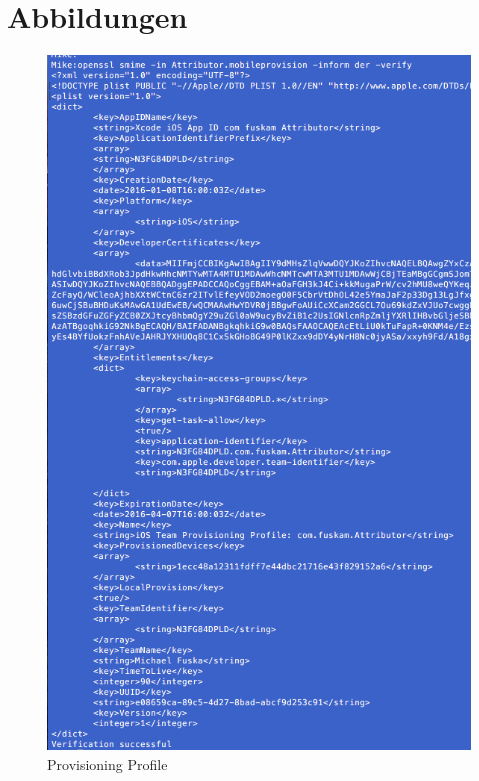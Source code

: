 \chapter{Abbildungen}
\newpage

\begin{figure}[htp!]
        \centering
                \includegraphics[scale=0.6]{SGML-Format}
        \caption{Provisioning Profile \protect\footnotemark}
        \label{fig:ProvisioningProfile}
\end{figure}
\newpage

